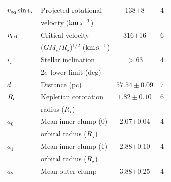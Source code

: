 \documentclass[11pt,twocolumn,tighten,linenumbers]{aastex7}
\newcommand{\kms}{\ensuremath{\rm km\,s^{-1}}}
\begin{document}
\begin{table}
\begin{tabular}{llcc}
%
$v_{\rm eq}\sin{i_\star}$\dotfill		    & Projected rotational\dotfill                                   &  138$\pm$8       & 4 \\
                                        & \hspace{3pt} velocity (\kms)	                                 &                      \\
%
$v_{\rm crit}$\dotfill		              & Critical velocity \dotfill                                      &  316$\pm$16      & 6 \\
                                        & \hspace{3pt} ($G M_\star / R_\star$)$^{1/2}$ (\kms)	           &                      \\
%
$i_\star$\dotfill                       & Stellar inclination\dotfill                                    & 	$>$63           & 4 \\
                                        & \hspace{3pt}  2$\sigma$ lower limit (deg)	                     &                      \\
%
$d$\dotfill                             & Distance (pc)\dotfill                                          & $57.54 \pm 0.09$ & 7 \\
%
$R_{\rm c}$\dotfill		                  & Keplerian corotation\dotfill                                   & $1.82 \pm 0.10$  & 6 \\
                                        & \hspace{3pt} radius ($R_\star$)	                               &                      \\
%
$a_0$\dotfill                           & Mean inner clump (0)\hspace{9pt}\dotfill           &  2.07$\pm$0.04   & 4 \\
                                        & \hspace{3pt} orbital radius ($R_\star$)	                       &                      \\
%
$a_1$\dotfill                           & Mean inner clump (1)\hspace{9pt}\dotfill           &  2.88$\pm$0.10   & 4 \\
                                        & \hspace{3pt} orbital radius ($R_\star$)	                       &                      \\
%
$a_2$\dotfill                           & Mean outer clump\hspace{9pt}\dotfill           &  3.88$\pm$0.25   & 4 \\

\end{tabular}
\end{table}
\end{document}
